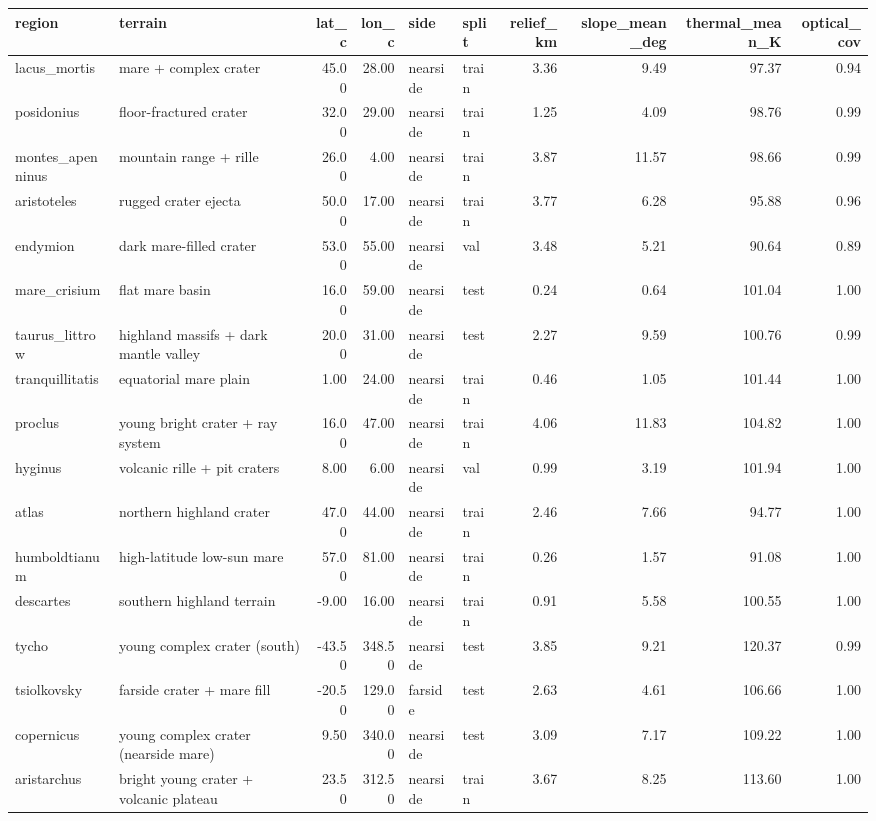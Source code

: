 \begin{tabular}{llrrllrrrr}
\toprule
region & terrain & lat\_c & lon\_c & side & split & relief\_km & slope\_mean\_deg & thermal\_mean\_K & optical\_cov \\
\midrule
lacus\_mortis & mare + complex crater & 45.00 & 28.00 & nearside & train & 3.36 & 9.49 & 97.37 & 0.94 \\
posidonius & floor-fractured crater & 32.00 & 29.00 & nearside & train & 1.25 & 4.09 & 98.76 & 0.99 \\
montes\_apenninus & mountain range + rille & 26.00 & 4.00 & nearside & train & 3.87 & 11.57 & 98.66 & 0.99 \\
aristoteles & rugged crater ejecta & 50.00 & 17.00 & nearside & train & 3.77 & 6.28 & 95.88 & 0.96 \\
endymion & dark mare-filled crater & 53.00 & 55.00 & nearside & val & 3.48 & 5.21 & 90.64 & 0.89 \\
mare\_crisium & flat mare basin & 16.00 & 59.00 & nearside & test & 0.24 & 0.64 & 101.04 & 1.00 \\
taurus\_littrow & highland massifs + dark mantle valley & 20.00 & 31.00 & nearside & test & 2.27 & 9.59 & 100.76 & 0.99 \\
tranquillitatis & equatorial mare plain & 1.00 & 24.00 & nearside & train & 0.46 & 1.05 & 101.44 & 1.00 \\
proclus & young bright crater + ray system & 16.00 & 47.00 & nearside & train & 4.06 & 11.83 & 104.82 & 1.00 \\
hyginus & volcanic rille + pit craters & 8.00 & 6.00 & nearside & val & 0.99 & 3.19 & 101.94 & 1.00 \\
atlas & northern highland crater & 47.00 & 44.00 & nearside & train & 2.46 & 7.66 & 94.77 & 1.00 \\
humboldtianum & high-latitude low-sun mare & 57.00 & 81.00 & nearside & train & 0.26 & 1.57 & 91.08 & 1.00 \\
descartes & southern highland terrain & -9.00 & 16.00 & nearside & train & 0.91 & 5.58 & 100.55 & 1.00 \\
tycho & young complex crater (south) & -43.50 & 348.50 & nearside & test & 3.85 & 9.21 & 120.37 & 0.99 \\
tsiolkovsky & farside crater + mare fill & -20.50 & 129.00 & farside & test & 2.63 & 4.61 & 106.66 & 1.00 \\
copernicus & young complex crater (nearside mare) & 9.50 & 340.00 & nearside & test & 3.09 & 7.17 & 109.22 & 1.00 \\
aristarchus & bright young crater + volcanic plateau & 23.50 & 312.50 & nearside & train & 3.67 & 8.25 & 113.60 & 1.00 \\

\end{tabular}
